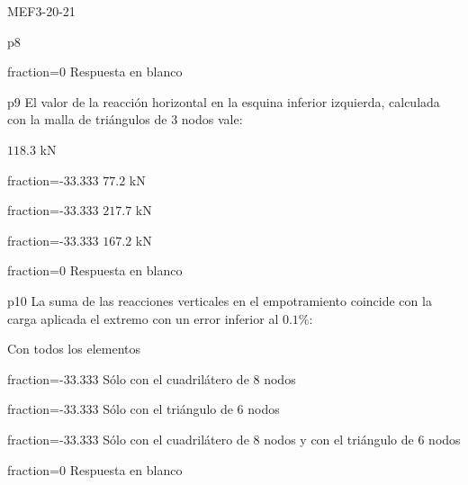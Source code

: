 \documentclass[a4paper]{article}
\begin{document}
\begin{quiz}{MEF3-20-21}
\begin{multi}{p8}
	\item[fraction=0] Respuesta en blanco
\end{multi}
\begin{multi}{p9}
	El valor de la reacci\'on horizontal en la esquina inferior izquierda, calculada con
	la malla de tri\'angulos de $3$ nodos vale:
	\item* $118.3$ kN
	\item[fraction=-33.333] $77.2$ kN
	\item[fraction=-33.333] $217.7$ kN
	\item[fraction=-33.333] $167.2$ kN
	\item[fraction=0] Respuesta en blanco
\end{multi}
\begin{multi}{p10}
La suma de las reacciones verticales en el empotramiento coincide con la
carga aplicada el extremo con un error inferior al $0.1$\%:
	\item* Con todos los elementos
	\item[fraction=-33.333] S\'olo con el cuadril\'atero de $8$ nodos
	\item[fraction=-33.333] S\'olo con el tri\'angulo de $6$ nodos
	\item[fraction=-33.333] S\'olo con el cuadril\'atero de $8$ nodos y con el tri\'angulo
                     de $6$ nodos
                     \item[fraction=0] Respuesta en blanco
\end{multi}


\end{quiz}
\end{document}
